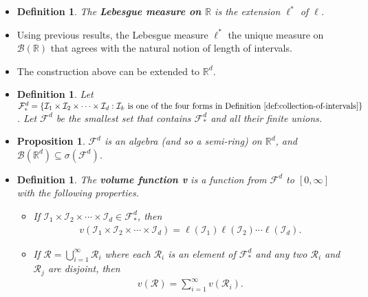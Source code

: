 \documentclass[10pt]{article}
\newtheorem{definition}[lemma]{Definition}
\newtheorem{proposition}[lemma]{Proposition}
\numberwithin{lemma}{section}
\newcommand{\mcal}[1]{\mathcal{#1}}
\newcommand{\Real}{\mathbb{R}}
\begin{document}
\begin{itemize}
  \item \begin{definition} \label{def:lebesgue-measure-1d}
    The {\bf Lebesgue measure on $\Real$} is the extension $\ell^*$ of $\ell$.
  \end{definition}
  
  \item Using previous results, the Lebesgue measure $\ell^*$ the unique measure on $\mathcal{B}(\Real)$ that agrees with the natural notion of length of intervals. 
  
  \item The construction above can be extended to $\Real^d$.
  
  \item \begin{definition}
    Let $\mcal{F}^d_* = \{ \mcal{I}_1 \times \mcal{I}_2 \times \dotsb \times \mcal{I}_d : \mcal{I}_k \mbox{ is one of the four forms in Definition~\ref{def:collection-of-intervals}}\}$. Let $\mcal{F}^d$ be the smallest set that contains $\mcal{F}_*^d$ and all their finite unions.
  \end{definition}
  
  \item \begin{proposition}
    $\mcal{F}^d$ is an algebra (and so a semi-ring) on $\Real^d$, and $\mcal{B}(\Real^d) \subseteq \sigma(\mcal{F}^d)$.
  \end{proposition}

  \item \begin{definition}
    The {\bf volume function v} is a function from $\mcal{F}^d$ to $[0,\infty]$ with the following properties.
    \begin{itemize}
      \item If $\mcal{I}_1 \times \mcal{I}_2 \times \dotsb \times \mcal{I}_d \in \mcal{F}^d_*$, then
      \begin{align*}
        v(\mcal{I}_1 \times \mcal{I}_2 \times \dotsb \times \mcal{I}_d) = \ell(\mcal{I}_1) \ell(\mcal{I}_2) \dotsm \ell(\mcal{I}_d).
      \end{align*}
      \item If $\mcal{R} = \bigcup_{i=1}^\infty \mcal{R}_i$ where each $\mcal{R}_i$ is an element of $\mcal{F}^d_*$ and any two $\mcal{R}_i$ and $\mcal{R}_j$ are disjoint, then
      \begin{align*}
        v(\mcal{R}) = \sum_{i=1}^\infty v(\mcal{R}_i).
      \end{align*}
    \end{itemize}
  \end{definition}


\end{itemize}
\end{document}
